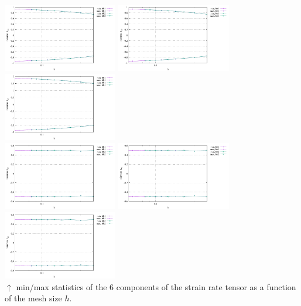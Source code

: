 \begin{center}
\includegraphics[width=5cm]{python_codes/fieldstone_75/results/mms3D/exx_stats.pdf}
\includegraphics[width=5cm]{python_codes/fieldstone_75/results/mms3D/eyy_stats.pdf}
\includegraphics[width=5cm]{python_codes/fieldstone_75/results/mms3D/ezz_stats.pdf}\\
\includegraphics[width=5cm]{python_codes/fieldstone_75/results/mms3D/exy_stats.pdf}
\includegraphics[width=5cm]{python_codes/fieldstone_75/results/mms3D/exz_stats.pdf}
\includegraphics[width=5cm]{python_codes/fieldstone_75/results/mms3D/eyz_stats.pdf}\\
{\captionfont $\uparrow$ min/max statistics of the 6 components of the strain rate tensor
as a function of the mesh size $h$.}
\end{center}


